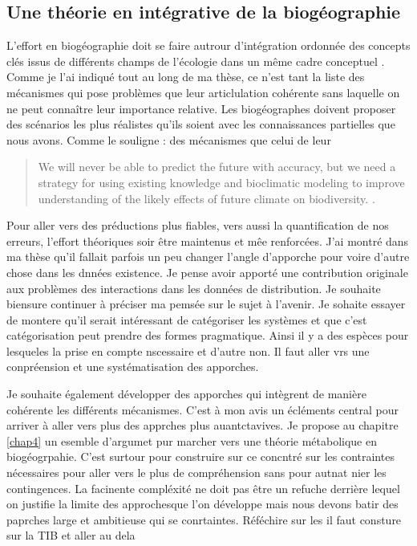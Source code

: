 \subsection*{Une théorie en intégrative de la
biogéographie}\label{une-thuxe9orie-en-intuxe9grative-de-la-bioguxe9ographie}

L'effort en biogéographie doit se faire autrour d'intégration ordonnée
des concepts clés issus de différents champs de l'écologie dans un même
cadre conceptuel \citep{Thuiller2013}. Comme je l'ai indiqué tout au
long de ma thèse, ce n'est tant la liste des mécanismes qui pose
problèmes que leur articlulation cohérente sans laquelle on ne peut
connaître leur importance relative. Les biogéographes doivent proposer
des scénarios les plus réalistes qu'ils soient avec les connaissances
partielles que nous avons. Comme le souligne \citet{Araujo2006}: des
mécanismes que celui de leur

\begin{quote}
We will never be able to predict the future with accuracy, but we need a
strategy for using existing knowledge and bioclimatic modeling to
improve understanding of the likely effects of future climate on
biodiversity. \citep{Araujo2006}.
\end{quote}

Pour aller vers des préductions plus fiables, vers aussi la
quantification de nos erreurs, l'effort théoriques soir être maintenus
et mêe renforcées. J'ai montré dans ma thèse qu'il fallait parfois un
peu changer l'angle d'apporche pour voire d'autre chose dans les dnnées
existence. Je pense avoir apporté une contribution originale aux
problèmes des interactions dans les données de distribution. Je souhaite
biensure continuer à préciser ma pemsée sur le sujet à l'avenir. Je
sohaite essayer de montere qu'il serait intéressant de catégoriser les
systèmes et que c'est catégorisation peut prendre des formes
pragmatique. Ainsi il y a des espèces pour lesqueles la prise en compte
nscessaire et d'autre non. Il faut aller vrs une conpréension et une
systématisation des apporches.

Je souhaite également développer des apporches qui intègrent de manière
cohérente les différents mécanismes. C'est à mon avis un écléments
central pour arriver à aller vers plus des apprches plus auantctavives.
Je propose au chapitre \ref{chap4} un esemble d'argumet pur marcher vers
une théorie métabolique en biogéogrpahie. C'est surtour pour construire
sur ce concntré sur les contraintes nécessaires pour aller vers le plus
de compréhension sans pour autnat nier les contingences. La facinente
compléxité ne doit pas être un refuche derrière lequel on justifie la
limite des approchesque l'on développe mais nous devons batir des
paprches large et ambitieuse qui se conrtaintes. Réféchire sur les il
faut consture sur la TIB et aller au dela

